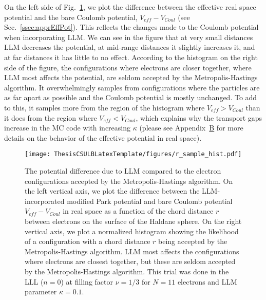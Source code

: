     On the left side of Fig.~\ref{fig:r_sample_hist}, we plot the difference between the effective real space potential and the bare Coulomb potential, $V_{eff}-V_{Coul}$ (see Sec.~\ref{ssec:apprEffPot}). This reflects the changes made to the Coulomb potential when incorporating LLM. We can see in the figure that at very small distances LLM decreases the potential, at mid-range distances it slightly increases it, and at far distances it has little to no effect. According to the histogram on the right side of the figure, the configurations where electrons are closer together, where LLM most affects the potential, are seldom accepted by the Metropolis-Hastings algorithm. It overwhelmingly samples from configurations where the particles are as far apart as possible and the Coulomb potential is mostly unchanged. To add to this, it samples more from the region of the histogram where $V_{eff}>V_{Coul}$ than it does from the region where $V_{eff}<V_{Coul}$, which explains why the transport gaps increase in the MC code with increasing $\kappa$ (please see Appendix~\hyperref[appendixB]{B} for more details on the behavior of the effective potential in real space).
    
    \begin{figure}[h]
    \begin{center}
    \texttt{[image: ThesisCSULBLatexTemplate/figures/r\_sample\_hist.pdf]}
    \caption[The potential difference due to LLM compared to the electron configurations accepted by the Metropolis-Hastings algorithm.]{The potential difference due to LLM compared to the electron configurations accepted by the Metropolis-Hastings algorithm. On the left vertical axis, we plot the difference between the LLM-incorporated modified Park potential and bare Coulomb potential $V_{eff}-V_{Coul}$ in real space as a function of the chord distance $r$ between electrons on the surface of the Haldane sphere. On the right vertical axis, we plot a normalized histogram showing the likelihood of a configuration with a chord distance $r$ being accepted by the Metropolis-Hastings algorithm. LLM most affects the configurations where electrons are closest together, but these are seldom accepted by the Metropolis-Hastings algorithm. This trial was done in the LLL ($n=0$) at filling factor $\nu=1/3$ for $N=11$ electrons and LLM parameter $\kappa=0.1$.}
    \label{fig:r_sample_hist} 
    \end{center}
    \end{figure}
    
